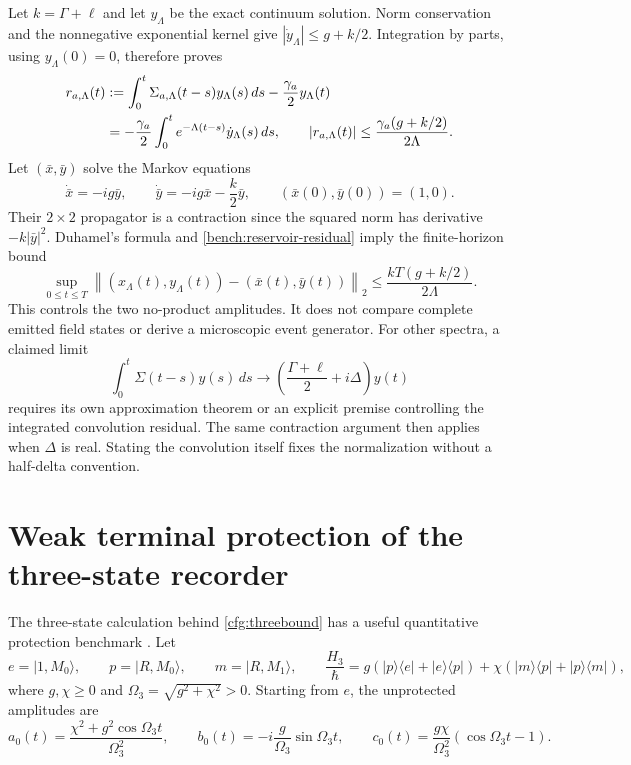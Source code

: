 \documentclass[11pt,oneside,openany]{book}
\theoremstyle{definition}
\theoremstyle{remark}\newtheorem{remark}[theorem]{Remark}
\begin{document}
Let $k=\Gamma+\ell$ and let $y_\Lambda$ be the exact continuum solution.
Norm conservation and the nonnegative exponential kernel give
$|\dot y_\Lambda|\le g+k/2$. Integration by parts, using
$y_\Lambda(0)=0$, therefore proves
\begin{align}
 r_{a,\Lambda}(t)
 &:=\int_0^t\Sigma_{a,\Lambda}(t-s)y_\Lambda(s)\,ds
                          -\frac{\gamma_a}{2}y_\Lambda(t)\notag\\
 &=-\frac{\gamma_a}{2}\int_0^t
              e^{-\Lambda(t-s)}\dot y_\Lambda(s)\,ds,
 \qquad
 |r_{a,\Lambda}(t)|\le
       \frac{\gamma_a(g+k/2)}{2\Lambda}.
 \label{bench:reservoir-residual}
\end{align}
Let $(\bar x,\bar y)$ solve the Markov equations
\[
 \dot{\bar x}=-ig\bar y,\qquad
 \dot{\bar y}=-ig\bar x-\frac{k}{2}\bar y,
 \qquad (\bar x(0),\bar y(0))=(1,0).
\]
Their $2\times2$ propagator is a contraction since the squared norm has
derivative $-k|\bar y|^2$. Duhamel's formula and
\eqref{bench:reservoir-residual} imply the finite-horizon bound
\begin{equation}
 \sup_{0\le t\le T}
 \left\|(x_\Lambda(t),y_\Lambda(t))-(\bar x(t),\bar y(t))\right\|_2
 \le \frac{kT(g+k/2)}{2\Lambda}.
 \label{bench:reservoir-markovbound}
\end{equation}
This controls the two no-product amplitudes. It does not compare complete
emitted field states or derive a microscopic event generator. For other
spectra, a claimed limit
\[
 \int_0^t\Sigma(t-s)y(s)\,ds
       \longrightarrow \left(\frac{\Gamma+\ell}{2}+i\Delta\right)y(t)
\]
requires its own approximation theorem or an explicit premise controlling
the integrated convolution residual. The same contraction argument then
applies when $\Delta$ is real. Stating the convolution itself fixes the
normalization without a half-delta convention.

\section{Weak terminal protection of the three-state recorder}
\label{bench:protection}

The three-state calculation behind \eqref{cfg:threebound} has a useful
quantitative protection benchmark \cite[\S12]{C02}. Let
\[
 e=|1,M_0\rangle,\qquad p=|R,M_0\rangle,\qquad m=|R,M_1\rangle,
 \qquad
 \frac{H_3}{\hbar}
 =g(|p\rangle\langle e|+|e\rangle\langle p|)
  +\chi(|m\rangle\langle p|+|p\rangle\langle m|),
\]
where $g,\chi\ge0$ and $\Omega_3=\sqrt{g^2+\chi^2}>0$.
Starting from $e$, the unprotected amplitudes are
\begin{equation}
 a_0(t)=\frac{\chi^2+g^2\cos\Omega_3t}{\Omega_3^2},\qquad
 b_0(t)=-i\frac{g}{\Omega_3}\sin\Omega_3t,\qquad
 c_0(t)=\frac{g\chi}{\Omega_3^2}(\cos\Omega_3t-1).
 \label{bench:protection-unperturbed}
\end{equation}
\end{document}
